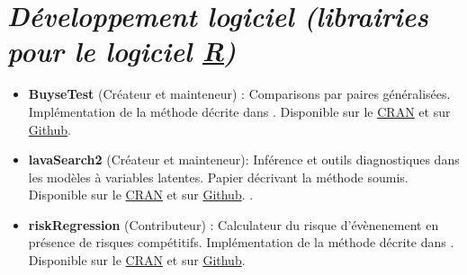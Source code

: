 \documentclass[12pt]{article}
\begin{document}
\section*{\emph{Développement logiciel (librairies pour le logiciel \href{https://www.r-project.org/}{R})}}
\label{sec:org7dcb6c5}
\begin{minipage}{0.01\textwidth}
\hspace{\fill}
\end{minipage}
\begin{minipage}{0.92\textwidth}
\begin{itemize}
\item \textbf{BuyseTest} (Créateur et mainteneur) : Comparisons par paires
généralisées. Implémentation de la méthode décrite dans
\citep{peron2016extension}. Disponible sur le \href{https://cran.r-project.org/web/packages/BuyseTest/index.html}{CRAN} et sur \href{https://github.com/bozenne/BuyseTest}{Github}.

\item \textbf{lavaSearch2} (Créateur et mainteneur): Inférence et outils
diagnostiques dans les modèles à variables latentes. Papier
décrivant la méthode soumis. Disponible sur le \href{https://cran.r-project.org/web/packages/lavaSearch2/index.html}{CRAN} et sur \href{https://github.com/bozenne/lavaSearch2}{Github}. .

\item \textbf{riskRegression} (Contributeur) : Calculateur du risque
d'évènenement en présence de risques compétitifs. Implémentation de
la méthode décrite dans \citep{ozenne2017riskregression}. Disponible
sur le \href{https://cran.r-project.org/web/packages/riskRegression/index.html}{CRAN} et sur \href{https://github.com/tagteam/riskRegression}{Github}.
\end{itemize}
\end{minipage}

\bigskip
\end{document}
